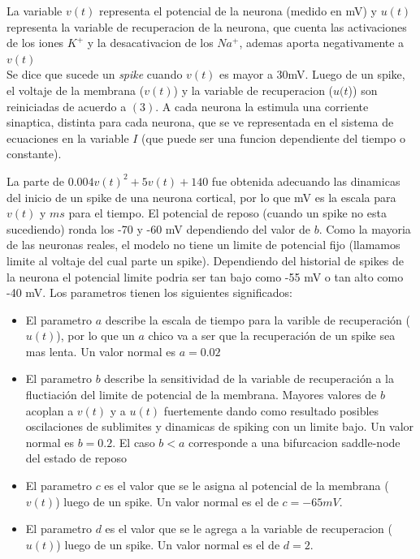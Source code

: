 \documentclass[12pt]{article}
\begin{document}
La variable $v(t)$ representa el potencial de la neurona (medido en mV) y $u(t)$ representa la variable de recuperacion de la neurona,
que cuenta las activaciones de los iones $K^{+}$ y la desacativacion de los $Na^{+}$, ademas aporta negativamente a $v(t)$ \\

Se dice que sucede un \textit{spike} cuando $v(t)$ es mayor a 30mV. Luego de un spike, el voltaje de la membrana ($v(t)$) y la variable de recuperacion ($u(t$)) son reiniciadas de acuerdo a $(3)$.
A cada neurona la estimula una corriente sinaptica, distinta para cada neurona, que se ve representada en el sistema de ecuaciones en la variable $I$ (que puede ser una funcion dependiente del tiempo o constante).

La parte de $0.004v(t)^2 + 5v(t) + 140$ fue obtenida adecuando las dinamicas del inicio de un spike de una neurona cortical, por lo que mV es la escala para $v(t)$ y $ms$ para el tiempo.
El potencial de reposo (cuando un spike no esta sucediendo) ronda los -70 y -60 mV dependiendo del valor de $b$. Como la mayoria de las neuronas reales, el modelo no tiene un limite de potencial fijo (llamamos limite al voltaje del cual parte un spike).
Dependiendo del historial de spikes de la neurona el potencial limite podria ser tan bajo como -55 mV o tan alto como -40 mV.
Los parametros tienen los siguientes significados:
\begin{itemize}
    \item El parametro $a$ describe la escala de tiempo para la varible de recuperación ($u(t)$), por lo que un $a$ chico va a ser que la recuperación de un spike sea mas lenta. Un valor normal es $a = 0.02$
    \item El parametro $b$ describe la sensitividad de la variable de recuperación a la fluctiación del limite de potencial de la membrana. Mayores valores de $b$ acoplan a $v(t)$ y a $u(t)$ fuertemente dando como resultado
posibles oscilaciones de sublimites y dinamicas de spiking con un limite bajo. Un valor normal es $b = 0.2$. El caso $b < a$ corresponde a una bifurcacion saddle-node del estado de reposo \cite{modeloPrimero}
    \item El parametro $c$ es el valor que se le asigna al potencial de la membrana ($v(t)$) luego de un spike. Un valor normal es el de $c = -65 mV$.
    \item El parametro $d$ es el valor que se le agrega a la variable de recuperacion ($u(t)$) luego de un spike. Un valor normal es el de $d = 2$.
\end{itemize}
\end{document}
